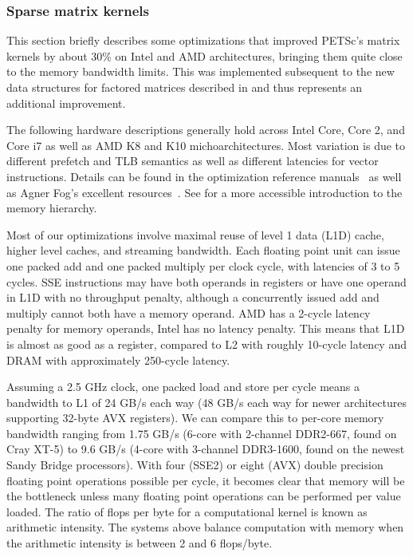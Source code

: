 \subsubsection{Sparse matrix kernels}

This section briefly describes some optimizations that improved PETSc's matrix kernels by about 30\% on Intel and AMD architectures, bringing them quite close to the memory bandwidth limits.
This was implemented subsequent to the new data structures for factored matrices described in \cite{smith2010sparse} and thus represents an additional improvement.

The following hardware descriptions generally hold across Intel Core, Core 2, and Core i7 as well as AMD K8 and K10 michoarchitectures.
Most variation is due to different prefetch and TLB semantics as well as different latencies for vector instructions.
Details can be found in the optimization reference manuals~\cite{intel2011optimization,amd2009optimization} as well as Agner Fog's excellent resources~\cite{fog2011michoarchitecture,fog2011instruction}.
See \cite{drepper2007memory} for a more accessible introduction to the memory hierarchy.

Most of our optimizations involve maximal reuse of level 1 data (L1D) cache, higher level caches, and streaming bandwidth.
Each floating point unit can issue one packed add and one packed multiply per clock cycle, with latencies of 3 to 5 cycles.
SSE instructions may have both operands in registers or have one operand in L1D with no throughput penalty, although a concurrently issued add and multiply cannot both have a memory operand.
AMD has a 2-cycle latency penalty for memory operands, Intel has no latency penalty.
This means that L1D is almost as good as a register, compared to L2 with roughly 10-cycle latency and DRAM with approximately 250-cycle latency.

Assuming a 2.5 GHz clock, one packed load and store per cycle means a bandwidth to L1 of 24 GB/s each way (48 GB/s each way for newer architectures supporting 32-byte AVX registers).
We can compare this to per-core memory bandwidth ranging from 1.75 GB/s (6-core with 2-channel DDR2-667, found on Cray XT-5) to 9.6 GB/s (4-core with 3-channel DDR3-1600, found on the newest Sandy Bridge processors).
With four (SSE2) or eight (AVX) double precision floating point operations possible per cycle, it becomes clear that memory will be the bottleneck unless many floating point operations can be performed per value loaded.
The ratio of flops per byte for a computational kernel is known as arithmetic intensity.
The systems above balance computation with memory when the arithmetic intensity is between 2 and 6 flops/byte.

